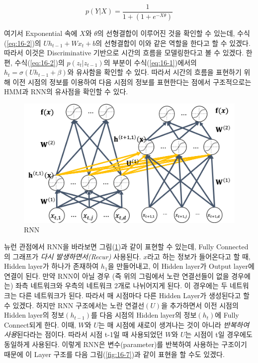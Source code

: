 \documentclass[draft=false]{oblivoir}
\begin{document}
\begin{equation}
	p(Y|X) = \frac{1}{1+(1+e^{-X \theta})}
\label{eq:16-3}
\end{equation}

여기서 Exponential 속에 $X$와 $\theta$의 선형결합이 이루어진 것을 확인할 수 있는데, 수식(\ref{eq:16-2})의 $Uh_{t-1}+Wx_{t}+b$의 선형결합이 이와 같은 역할을 한다고 할 수 있겠다. 따라서 이것은 Discriminative 기반으로 시간의 흐름을 모델링한다고 볼 수 있겠다. 한편, 수식(\ref{eq:16-2})의 $p(z_{t}|z_{t-1})$의 부분이 수식(\ref{eq:16-1})에서의 $h_t = \sigma(Uh_{t-1} + \beta)$와 유사함을 확인할 수 있다. 따라서 시간의 흐름을 표현하기 위해 이전 시점의 정보를 이용하여 다음 시점의 정보를 표현한다는 점에서 구조적으로는 HMM과 RNN의 유사점을 확인할 수 있다.\par

\begin{figure}[ht] \centering 
  \includegraphics[scale=0.6]{fig6.png}
  \caption{RNN}
  \label{fig:16-6}
\end{figure}

뉴런 관점에서 RNN을 바라보면 그림(\ref{fig:16-6})과 같이 표현할 수 있는데, Fully Connected의 그래프가 \textit{다시 발생하면서(Recur)} 사용된다. $x$라고 하는 정보가 들어온다고 할 때, Hidden layer가 하나가 존재하여 $h_1$을 만들어내고, 이 Hidden layer가 Output layer에 연결이 된다. 만약 RNN이 아닐 경우 (즉 위의 그림에서 노란 연결선들이 없을 경우에는) 좌측 네트워크와 우측의 네트워크 2개로 나뉘어지게 된다. 이 경우에는 두 네트워크는 다른 네트워크가 된다. 따라서 매 시점마다 다른 Hidden Layer가 생성된다고 할 수 있겠다. 하지만 RNN 구조에서는 노란 연결선$(U)$을 추가하면서 이전 시점의 Hidden layer의 정보$(h_{t-1})$를 다음 시점의 Hidden layer의 정보$(h_t)$에 Fully Connect되게 한다. 이때, $W$와 $U$는 매 시점에 새로이 생겨나는 것이 아니라 \textit{반복하여 사용}된다라는 점이다. 따라서 시점 t-1일 때 사용되었던 $W$와 $U$는 시점이 t일 경우에도 동일하게 사용된다. 이렇게 RNN은 변수(parameter)를 반복하여 사용하는 구조이기 때문에 이 Layer 구조를 다음 그림(\ref{fig:16-7})과 같이 표현을 할 수도 있겠다.
\end{document}
